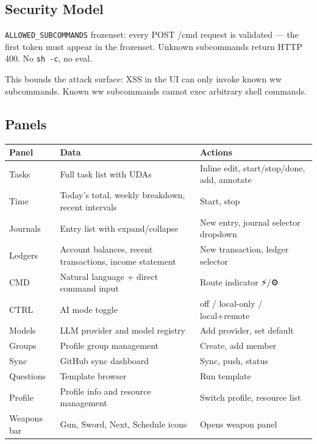 \documentclass[
]{article}
\newcounter{none} %
\begin{document}
\subsection{Security Model}\label{security-model}

\texttt{ALLOWED\_SUBCOMMANDS} frozenset: every POST /cmd request is
validated --- the first token must appear in the frozenset. Unknown
subcommands return HTTP 400. No \texttt{sh\ -c}, no eval.

This bounds the attack surface: XSS in the UI can only invoke known ww
subcommands. Known ww subcommands cannot exec arbitrary shell commands.

\subsection{Panels}\label{panels}

{\def\LTcaptype{none} %
\begin{longtable}[]{@{}
  >{\raggedright\arraybackslash}p{}
  >{\raggedright\arraybackslash}p{}
  >{\raggedright\arraybackslash}p{}@{}}
\toprule\noalign{}
\begin{minipage}[b]{\linewidth}\raggedright
Panel
\end{minipage} & \begin{minipage}[b]{\linewidth}\raggedright
Data
\end{minipage} & \begin{minipage}[b]{\linewidth}\raggedright
Actions
\end{minipage} \\
\midrule\noalign{}
\endhead
\bottomrule\noalign{}
\endlastfoot
Tasks & Full task list with UDAs & Inline edit, start/stop/done, add,
annotate \\
Time & Today's total, weekly breakdown, recent intervals & Start,
stop \\
Journals & Entry list with expand/collapse & New entry, journal selector
dropdown \\
Ledgers & Account balances, recent transactions, income statement & New
transaction, ledger selector \\
CMD & Natural language + direct command input & Route indicator ⚡/⚙ \\
CTRL & AI mode toggle & off / local-only / local+remote \\
Models & LLM provider and model registry & Add provider, set default \\
Groups & Profile group management & Create, add member \\
Sync & GitHub sync dashboard & Sync, push, status \\
Questions & Template browser & Run template \\
Profile & Profile info and resource management & Switch profile,
resource list \\
Weapons bar & Gun, Sword, Next, Schedule icons & Opens weapon panel \\
\end{longtable}
}
\end{document}
